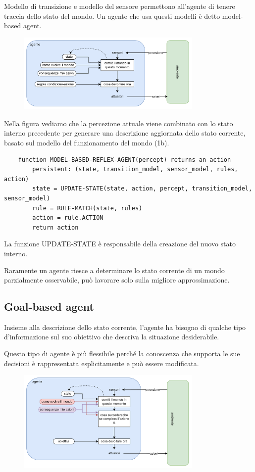 Modello di transizione e modello del sensore permettono all'agente di tenere traccia dello stato del mondo. Un agente che usa questi modelli è detto model-based agent.

\begin{figure}[H]
	\centering
	\includegraphics[width=0.8\textwidth]{capitoli/agenti-intelligenti/imgs/model-based.png}
\end{figure}

Nella figura vediamo che la percezione attuale viene combinato con lo stato interno precedente per generare una descrizione aggiornata dello stato corrente, basato sul modello del funzionamento del mondo (1b).

\begin{lstlisting}
	function MODEL-BASED-REFLEX-AGENT(percept) returns an action
		persistent: (state, transition_model, sensor_model, rules, action)
		state = UPDATE-STATE(state, action, percept, transition_model, sensor_model)
		rule = RULE-MATCH(state, rules)
		action = rule.ACTION
		return action
\end{lstlisting}

La funzione UPDATE-STATE è responsabile della creazione del nuovo stato interno.

Raramente un agente riesce a determinare lo stato corrente di un mondo parzialmente osservabile, può lavorare solo sulla migliore approssimazione.

\subsection{Goal-based agent}

Insieme alla descrizione dello stato corrente, l'agente ha bisogno di qualche tipo d'informazione sul suo obiettivo che descriva la situazione desiderabile.

Questo tipo di agente è più flessibile perché la conoscenza che supporta le sue decisioni è rappresentata esplicitamente e può essere modificata.

\begin{figure}[H]
	\centering
	\includegraphics[width=0.8\textwidth]{capitoli/agenti-intelligenti/imgs/goal-based.png}
\end{figure}

